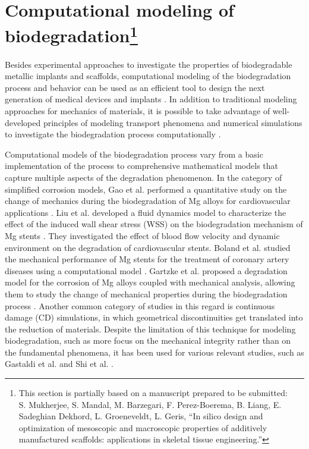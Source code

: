 \section[Computational modeling of biodegradation]{Computational modeling of biodegradation\footnote{This section is partially based on a manuscript prepared to be submitted:\\S. Mukherjee, S. Mandal, M. Barzegari, F. Perez-Boerema, B. Liang, E. Sadeghian Dekhord, L. Groeneveldt, L. Geris, ``In silico design and optimization of mesoscopic and macroscopic properties of additively manufactured scaffolds: applications in skeletal tissue engineering.''}}


Besides experimental approaches to investigate the properties of biodegradable metallic implants and scaffolds, computational modeling of the biodegradation process and behavior can be used as an efficient tool to design the next generation of medical devices and implants \cite{Boland2015}. In addition to traditional modeling approaches for mechanics of materials, it is possible to take advantage of well-developed principles of modeling transport phenomena and numerical simulations to investigate the biodegradation process computationally \cite{SanzHerrera2019}.


Computational models of the biodegradation process vary from a basic implementation of the process to comprehensive mathematical models that capture multiple aspects of the degradation phenomenon. In the category of simplified corrosion models, Gao et al. performed a quantitative study on the change of mechanics during the biodegradation of Mg alloys for cardiovascular applications \cite{Gao2018}. Liu et al. developed a fluid dynamics model to characterize the effect of the induced wall shear stress (\gls{WSS}) on the biodegradation mechanism of Mg stents \cite{Liu2018}. They investigated the effect of blood flow velocity and dynamic environment on the degradation of cardiovascular stents. Boland et al. studied the mechanical performance of Mg stents for the treatment of coronary artery diseases using a computational model \cite{Boland2019}. Gartzke et al. proposed a degradation model for the corrosion of Mg alloys coupled with mechanical analysis, allowing them to study the change of mechanical properties during the biodegradation process \cite{Gartzke2020}. Another common category of studies in this regard is continuous damage (\gls{CD}) simulations, in which geometrical discontinuities get translated into the reduction of materials. Despite the limitation of this technique for modeling biodegradation, such as more focus on the mechanical integrity rather than on the fundamental phenomena, it has been used for various relevant studies, such as Gastaldi et al. \cite{Gastaldi2011} and Shi et al. \cite{Shi2021}. 

